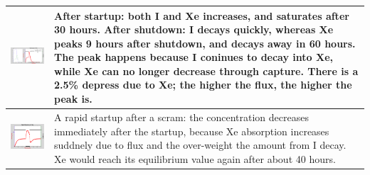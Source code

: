 \documentclass{school-22.211-notes}
\begin{document}
\begin{enumerate}
\begin{table}
  \centering
  \begin{tabular}{|p{}|p{}|}\hline
    \begin{minipage}[b]{0.6\textwidth}
      \includegraphics[width=3.5in]{images/dfs/I-Xe-1.png} 
    \end{minipage}
    & 
    \begin{minipage}[b]{0.4\textwidth}
      After startup: both I and Xe increases, and saturates after 30 hours. After shutdown: I decays quickly, whereas Xe peaks 9 hours after shutdown, and decays away in 60 hours. The peak happens because I coninues to decay into Xe, while Xe can no longer decrease through capture. 
There is a 2.5\% depress due to Xe; the higher the flux, the higher the peak is.
    \end{minipage}   \\ \hline
%
    \begin{minipage}[b]{0.6\textwidth}
      \includegraphics[width=3.5in]{images/dfs/I-Xe-2.png} 
    \end{minipage}
    & 
    \begin{minipage}[b]{0.4\textwidth}    
      A rapid startup after a scram: the concentration decreases immediately after the startup, because Xe absorption increases suddnely due to flux and the over-weight the amount from I decay. Xe would reach its equilibrium value again after about 40 hours. 
    \end{minipage}  \\ \hline

\end{tabular}
\end{table}
\end{enumerate}
\end{document}
